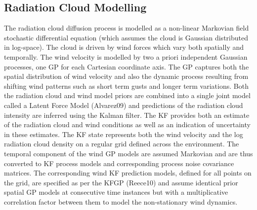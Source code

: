 \subsection{Radiation Cloud Modelling}
The radiation cloud diffusion process is modelled as a non-linear Markovian field stochastic differential 
equation (which assumes the cloud is Gaussian distributed in log-space).  The cloud is driven by wind 
forces which vary both spatially and temporally.  The wind velocity is modelled by two a priori independent 
Gaussian processes, one GP for each Cartesian coordinate axis.  The GP captures both the spatial distribution 
of wind velocity and also the dynamic process resulting from shifting wind patterns such as short term gusts 
and longer term variations.  Both the radiation cloud and wind model priors are combined into a single joint 
model called a Latent Force Model (Alvarez09) and predictions of the radiation cloud intensity are inferred 
using the Kalman filter.  The KF provides both an estimate of the radiation cloud and wind conditions as well 
as an indication of uncertainty in these estimates.  The KF state represents both the wind velocity and the log 
radiation cloud density on a regular grid defined across the environment.  The temporal component of the wind 
GP models are assumed Markovian and are thus converted to KF process models and corresponding process noise
covariance matrices.   The corresponding wind KF prediction models, defined for all points on the grid, are 
specified as per the KFGP (Reece10) and assume identical prior spatial GP models at consecutive time instances 
but with a multiplicative correlation factor between them to model the non-stationary wind dynamics.  

